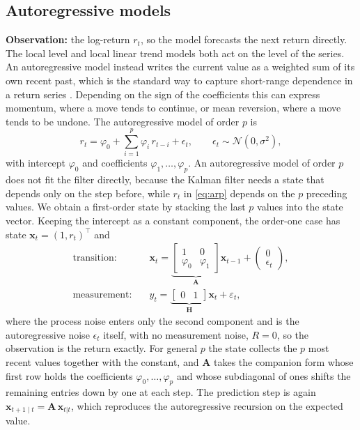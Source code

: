 \subsection{Autoregressive models}
\textbf{Observation:} the log-return $r_t$, so the model forecasts the next return directly.
The local level and local linear trend models both act on the level of the series. An autoregressive model instead writes the current value as a weighted sum of its own recent past, which is the standard way to capture short-range dependence in a return series
\cite[Section~7.2]{triantafyllopoulos:bayesian_state_space}.  Depending on the sign of the coefficients this can express momentum, where a move tends to continue, or mean reversion, where a move tends to be undone. The autoregressive model of order $p$ is
\begin{equation}\label{eq:arp}
  r_t = \varphi_0 + \sum_{i=1}^{p} \varphi_i\, r_{t-i} + \epsilon_t,
  \qquad \epsilon_t \sim \mathcal{N}(0,\sigma^2),
\end{equation}
with intercept $\varphi_0$ and coefficients $\varphi_1,\dots,\varphi_p$. An autoregressive model of order $p$ does not fit the filter directly, because the Kalman filter needs a state that depends only on the step before, while $r_t$ in \eqref{eq:arp} depends on the $p$ preceding values. We obtain a first-order state by stacking the last $p$ values into the state vector. Keeping the intercept as a constant component, the order-one case has state $\mathbf{x}_t = (1, r_t)^\top$ and
\begin{equation}\label{eq:ar1-ss}
\begin{aligned}
  \text{transition:}\quad & \mathbf{x}_t =
  \underbrace{\begin{bmatrix} 1 & 0 \\ \varphi_0 & \varphi_1 \end{bmatrix}}_{\mathbf{A}}
  \mathbf{x}_{t-1} + \begin{pmatrix} 0 \\ \epsilon_t \end{pmatrix}, \\
  \text{measurement:}\quad & y_t =
  \underbrace{\begin{bmatrix} 0 & 1 \end{bmatrix}}_{\mathbf{H}} \mathbf{x}_t
  + \varepsilon_t,
\end{aligned}
\end{equation}
where the process noise enters only the second component and is the autoregressive noise $\epsilon_t$ itself, with no measurement noise, $R = 0$, so the observation is the return exactly. For general $p$ the state collects the $p$ most recent values together with the constant, and $\mathbf{A}$ takes the companion form whose first row holds the coefficients $\varphi_0,\dots,\varphi_p$ and whose subdiagonal of ones shifts the remaining entries down by one at each step. The prediction step is again $\mathbf{x}_{t+1\mid t} = \mathbf{A}\,\mathbf{x}_{t|t}$, which reproduces the autoregressive recursion on the expected value.  

